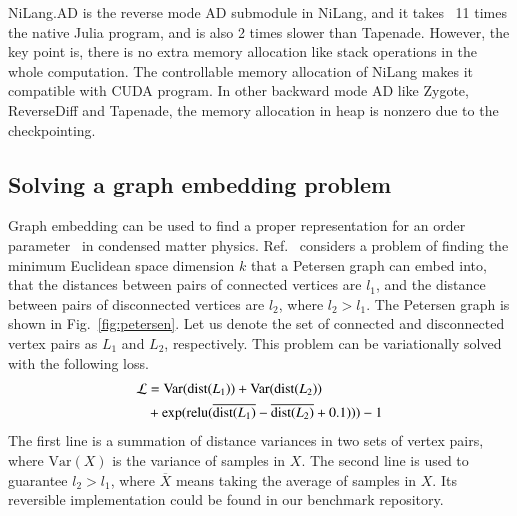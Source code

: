\documentclass{article}
\newcommand{\<}{\langle}
\renewcommand{\>}{\rangle}
\newcommand{\Var}{{\mathrm{Var}}}
\newcommand{\Fig}[1]{Fig.~\ref{#1}}
\newcommand{\Ref}[1]{Ref.~\cite{#1}}
\newcommand{\App}[1]{Appendix \ref{#1}}
\theoremstyle{definition}\newtheorem{definition}{\textit{Definition}}
\begin{document}
NiLang.AD is the reverse mode AD submodule in NiLang, and it takes ~11 times the native Julia program, and is also 2 times slower than Tapenade. However, the key point is, there is no extra memory allocation like stack operations in the whole computation. The controllable memory allocation of NiLang makes it compatible with CUDA program.
In other backward mode AD like Zygote, ReverseDiff and Tapenade, the memory allocation in heap is nonzero due to the checkpointing.


\subsection{Solving a graph embedding problem}\label{sec:graph}
Graph embedding can be used to find a proper representation for an order parameter~\cite{Takahashi2020} in condensed matter physics.
\Ref{Takahashi2020} considers a problem of finding the minimum Euclidean space dimension $k$ that a Petersen graph can embed into, that the distances between pairs of connected vertices are $l_1$, and the distance between pairs of disconnected vertices are $l_2$, where $l_2 > l_1$.
The Petersen graph is shown in \Fig{fig:petersen}.
Let us denote the set of connected and disconnected vertex pairs as $L_1$ and $L_2$, respectively. This problem can be variationally solved with the following loss.
\begin{align}
    \begin{split}
        \mathcal{L} &= \Var({\rm dist}(L_1)) + \Var({\rm dist}(L_2)) \\
        &+\exp({\rm relu}(\overline{{\rm dist}(L_1)} - \overline{{\rm dist}(L_2)} + 0.1))) - 1
    \end{split}
\end{align}
The first line is a summation of distance variances in two sets of vertex pairs, where $\Var(X)$ is the variance of samples in $X$.
The second line is used to guarantee $l_2 > l_1$, where $\overline{X}$ means taking the average of samples in $X$.
Its reversible implementation could be found in our benchmark repository.
\end{document}
